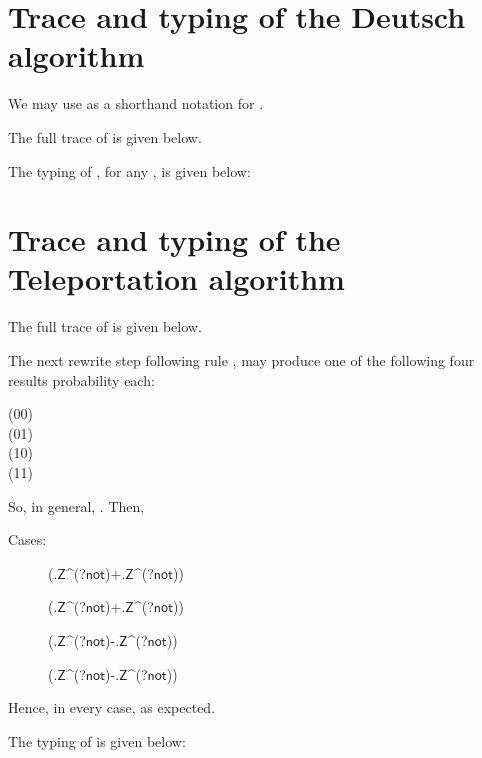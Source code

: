 \documentclass[preprint]{elsarticle}
\newcommand\ite[3]{{#1}?{#2}\mathord{\cdot}{#3}}
\newcommand\pair[2]{({#1}+{#2})}
\newcommand\npair[2]{({#1}-{#2})}
\newcommand\s[1]{\ensuremath{\mathsf{#1}}}
\begin{document}
\section{Trace and typing of the Deutsch algorithm}\label{ap:Deutsch}

We may use  as a shorthand notation for .

The full trace of  is given below.



The typing of , for any , is given
below:














\section{Trace and typing of the Teleportation algorithm}\label{ap:telep}
The full trace of  is
given below.




The next rewrite step following rule , may produce one of the following
four results probability  each:
\begin{description}
\item[(00)] 
\item[(01)] 
\item[(10)] 
\item[(11)] 
\end{description}

So, in general, . Then,

Cases:
\begin{description}
\item[]  \pair
        {\alpha.\s Z^{}(\ite{\ket 0}{\s{not}\ket 0}{\ket 0})} {\beta.\s
          Z^{\ket 0}(\ite{\ket 0}{\s{not}\ket 1}{})}
        

\item[]  \pair
        {\alpha.\s Z^{}(\ite{\ket 1}{\s{not}\ket 1}{\ket 1})} {\beta.\s
          Z^{\ket 0}(\ite{\ket 1}{\s{not}\ket 0}{})}
        

\item[]  \npair
        {\alpha.\s Z^{}(\ite{\ket 0}{\s{not}\ket 0}{\ket 0})} {\beta.\s
          Z^{\ket 1}(\ite{}{\s{not}\ket 1}{})}
        

\item[]  \npair
        {\alpha.\s Z^{\ket 1}(\ite{\ket 1}{\s{not}\ket 1}{\ket 1})} {\beta.\s
          Z^{\ket 1}(\ite{\ket 1}{\s{not}\ket 0}{\ket 0})}
        
\end{description}
Hence, in every case,  as expected. \medskip


The typing of  is given below:
\end{document}
